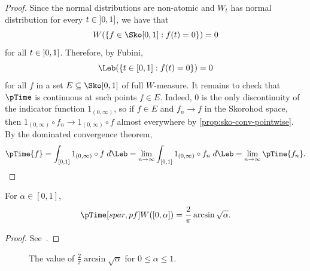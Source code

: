 \documentclass[../main]{subfiles}
\begin{document}
\begin{proof}
  Since the normal distributions are non-atomic and \(W_t\) has normal distribution for every \(t \in \interval[open left]{0}{1}\), we have that \[W(\{ f \in \WPS : f(t) = 0 \}) = 0\] for all \(t \in \interval[open left]{0}{1}\). Therefore, by Fubini, \[\Leb(\{ t \in [0,1] : f(t) = 0 \}) = 0\] for all \(f\) in a set \(E \subseteq \WPS\) of full \(W\)-measure. It remains to check that \(\pTime\) is continuous at such points \(f \in E\). Indeed, \(0\) is the only discontinuity of the indicator function \(1_{(0,\infty)}\), so if \(f \in E\) and \(f_n \to f\) in the Skorohod space, then \(1_{(0,\infty)} \circ f_n \to 1_{(0,\infty)} \circ f\) almost everywhere by \cref{prop:sko-conv-pointwise}. By the dominated convergence theorem,
  \begin{equation*}
    \pTime{f} =  \int_{[0,1]} 1_{(0,\infty)} \circ f \;d\Leb = \lim_{n \to \infty}
    \int_{[0,1]} 1_{(0,\infty)} \circ f_n \;d\Leb = \lim_{n \to \infty} \pTime{f_n}.
  \end{equation*}
\end{proof}

\begin{theorem}\label{thm:arcsine-brownian}
  For \(\alpha \in [0,1]\),
  \[\pTime[spar,pf]W([0,\alpha]) = \frac{2}{\pi} \arcsin \sqrt{\alpha}.\]
\end{theorem}

\begin{proof}
  See~\cite[equation 9.27]{billingsleyConvergenceProbabilityMeasures1999}.
\end{proof}

\begin{figure}[h]
  \centering
  \caption{The value of \(\frac{2}{\pi} \arcsin \sqrt{\alpha}\) for \(0 \le \alpha \le 1\).}
\end{figure}
\end{document}
